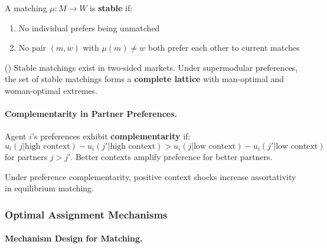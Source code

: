 \begin{definition}
\label{def:stable}
A matching $\mu: M \to W$ is \textbf{stable} if:
\begin{enumerate}
    \item No individual prefers being unmatched
    \item No pair $(m, w)$ with $\mu(m) \neq w$ both prefer each other to current matches
\end{enumerate}
\end{definition}

\begin{theorem}
\label{thm:stable-exist}
\textup{(\citet{gale1962college})}
Stable matchings exist in two-sided markets. Under supermodular preferences, the 
set of stable matchings forms a \textbf{complete lattice} with man-optimal and 
woman-optimal extremes.
\end{theorem}

\paragraph{Complementarity in Partner Preferences.}

\begin{definition}
\label{def:pref-comp}
Agent $i$'s preferences exhibit \textbf{complementarity} if:
\begin{equation}
u_i(j | \text{high context}) - u_i(j' | \text{high context}) > 
u_i(j | \text{low context}) - u_i(j' | \text{low context})
\end{equation}
for partners $j > j'$. Better contexts amplify preference for better partners.
\end{definition}

\begin{proposition}
\label{prop:context-assort}
Under preference complementarity, positive context shocks increase assortativity 
in equilibrium matching.
\end{proposition}

\subsubsection{Optimal Assignment Mechanisms}

\paragraph{Mechanism Design for Matching.}

